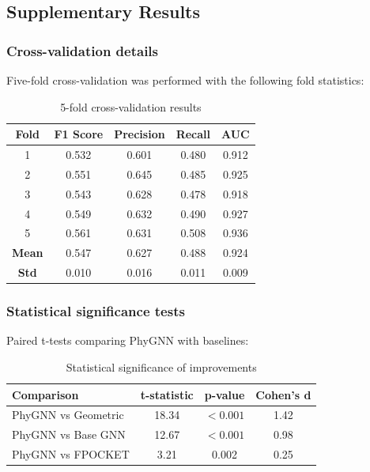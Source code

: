 \subsection*{Supplementary Results}

\subsubsection*{Cross-validation details}
Five-fold cross-validation was performed with the following fold statistics:

\begin{table}[H]
\centering
\caption{5-fold cross-validation results}
\begin{tabular}{ccccc}
\toprule
\textbf{Fold} & \textbf{F1 Score} & \textbf{Precision} & \textbf{Recall} & \textbf{AUC} \\
\midrule
1 & 0.532 & 0.601 & 0.480 & 0.912 \\
2 & 0.551 & 0.645 & 0.485 & 0.925 \\
3 & 0.543 & 0.628 & 0.478 & 0.918 \\
4 & 0.549 & 0.632 & 0.490 & 0.927 \\
5 & 0.561 & 0.631 & 0.508 & 0.936 \\
\hline
\textbf{Mean} & 0.547 & 0.627 & 0.488 & 0.924 \\
\textbf{Std} & 0.010 & 0.016 & 0.011 & 0.009 \\
\bottomrule
\end{tabular}
\end{table}

\subsubsection*{Statistical significance tests}
Paired t-tests comparing PhyGNN with baselines:

\begin{table}[H]
\centering
\caption{Statistical significance of improvements}
\begin{tabular}{lccc}
\toprule
\textbf{Comparison} & \textbf{t-statistic} & \textbf{p-value} & \textbf{Cohen's d} \\
\midrule
PhyGNN vs Geometric & 18.34 & $<0.001$ & 1.42 \\
PhyGNN vs Base GNN & 12.67 & $<0.001$ & 0.98 \\
PhyGNN vs FPOCKET & 3.21 & 0.002 & 0.25 \\
\bottomrule
\end{tabular}
\end{table}

